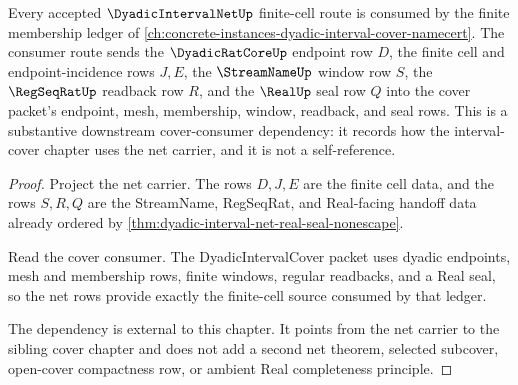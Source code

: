 \begin{theorem}\label{thm:dyadic-interval-net-sibling-route}
Every accepted $\DyadicIntervalNetUp$ finite-cell route is consumed by the finite membership ledger of \autoref{ch:concrete-instances-dyadic-interval-cover-namecert}. The consumer route sends the $\DyadicRatCoreUp$ endpoint row $D$, the finite cell and endpoint-incidence rows $J,E$, the $\StreamNameUp$ window row $S$, the $\RegSeqRatUp$ readback row $R$, and the $\RealUp$ seal row $Q$ into the cover packet's endpoint, mesh, membership, window, readback, and seal rows. This is a substantive downstream cover-consumer dependency: it records how the interval-cover chapter uses the net carrier, and it is not a self-reference.
\end{theorem}
\begin{proof}
Project the net carrier. The rows $D,J,E$ are the finite cell data, and the rows $S,R,Q$ are the StreamName, RegSeqRat, and Real-facing handoff data already ordered by \autoref{thm:dyadic-interval-net-real-seal-nonescape}.

Read the cover consumer. The DyadicIntervalCover packet uses dyadic endpoints, mesh and membership rows, finite windows, regular readbacks, and a Real seal, so the net rows provide exactly the finite-cell source consumed by that ledger.

The dependency is external to this chapter. It points from the net carrier to the sibling cover chapter and does not add a second net theorem, selected subcover, open-cover compactness row, or ambient Real completeness principle.
\end{proof}


